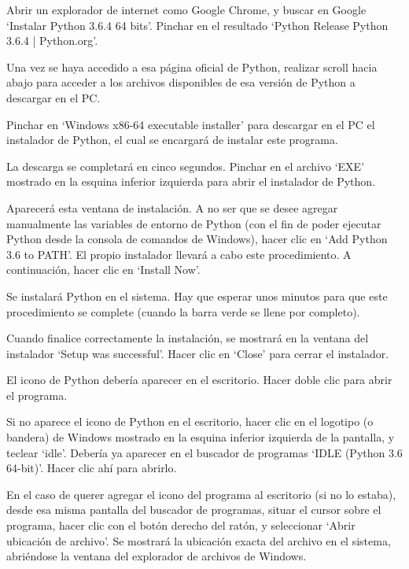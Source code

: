 \documentclass[12pt]{article}
\begin{document}
Abrir un explorador de internet como Google Chrome, y buscar en Google ‘Instalar Python 3.6.4 64 bits’. Pinchar en el resultado ‘Python Release Python 3.6.4 | Python.org’.



Una vez se haya accedido a esa página oficial de Python, realizar scroll hacia abajo para acceder a los archivos disponibles de esa versión de Python a descargar en el PC.



Pinchar en ‘Windows x86-64 executable installer’ para descargar en el PC el instalador de Python, el cual se encargará de instalar este programa.



La descarga se completará en cinco segundos. Pinchar en el archivo ‘EXE’ mostrado en la esquina inferior izquierda para abrir el instalador de Python.



Aparecerá esta ventana de instalación. A no ser que se desee agregar manualmente las variables de entorno de Python (con el fin de poder ejecutar Python desde la consola de comandos de Windows), hacer clic en ‘Add Python 3.6 to PATH’. El propio instalador llevará a cabo este procedimiento. A continuación, hacer clic en ‘Install Now’.



Se instalará Python en el sistema. Hay que esperar unos minutos para que este procedimiento se complete (cuando la barra verde se llene por completo).



Cuando finalice correctamente la instalación, se mostrará en la ventana del instalador ‘Setup was successful’. Hacer clic en ‘Close’ para cerrar el instalador.



El icono de Python debería aparecer en el escritorio. Hacer doble clic para abrir el programa.



Si no aparece el icono de Python en el escritorio, hacer clic en el logotipo (o bandera) de Windows mostrado en la esquina inferior izquierda de la pantalla, y teclear ‘idle’. Debería ya aparecer en el buscador de programas ‘IDLE (Python 3.6 64-bit)’. Hacer clic ahí para abrirlo.



En el caso de querer agregar el icono del programa al escritorio (si no lo estaba), desde esa misma pantalla del buscador de programas, situar el cursor sobre el programa, hacer clic con el botón derecho del ratón, y seleccionar ‘Abrir ubicación de archivo’. Se mostrará la ubicación exacta del archivo en el sistema, abriéndose la ventana del explorador de archivos de Windows.
\end{document}
